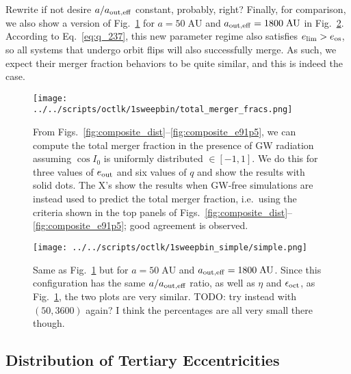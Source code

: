 \documentclass[
        fleqn,
        usenatbib,
    ]{mnras}
\newcommand*{\p}[1]{\left(#1\right)}
\begin{document}
\textcolor{Corr}{Rewrite if not desire $a / a_{\rm out, eff}$ constant,
probably, right?} Finally, for comparison, we also show a version of
Fig.~\ref{fig:total_merger_fracs} for $a = 50\;\mathrm{AU}$ and $a_{\rm out,
eff} = 1800\;\mathrm{AU}$ in Fig.~\ref{fig:sweepbin_simple}. According to
Eq.~\eqref{eq:q_237}, this new parameter regime also satisfies $e_{\lim} >
e_{\rm os}$, so all systems that undergo orbit flips will also successfully
merge. As such, we expect their merger fraction behaviors to be quite similar,
and this is indeed the case.
\begin{figure*}
    \centering
    \texttt{[image: ../../scripts/octlk/1sweepbin/total\_merger\_fracs.png]}
    \caption{From Figs.~\ref{fig:composite_dist}--\ref{fig:composite_e91p5},
    we can compute the total merger fraction in the presence of GW radiation
    assuming $\cos I_0$ is uniformly distributed $\in [-1, 1]$. We do this for
    three values of $e_{\rm out}$ and six values of $q$ and show the results
    with solid dots. The X's show the results when GW-free simulations are
    instead used to predict the total merger fraction, i.e.\ using the
    criteria shown in the top panels of
    Figs.~\ref{fig:composite_dist}--\ref{fig:composite_e91p5}; good agreement
    is observed. }\label{fig:total_merger_fracs}
\end{figure*}
\begin{figure*}
    \centering
    \texttt{[image: ../../scripts/octlk/1sweepbin\_simple/simple.png]}
    \caption{Same as Fig.~\ref{fig:total_merger_fracs} but for $a =
    50\;\mathrm{AU}$ and $a_{\rm out, eff} = 1800\;\mathrm{AU}$. Since this
    configuration has the same $a / a_{\rm out, eff}$ ratio, as well as $\eta$
    and $\epsilon_{\rm oct}$, as Fig.~\ref{fig:total_merger_fracs}, the two
    plots are very similar. \textcolor{Corr}{TODO\@: try instead with $\p{50,
    3600}$ again? I think the percentages are all very small there
    though.}}\label{fig:sweepbin_simple}
\end{figure*}

\subsection{Distribution of Tertiary Eccentricities}
\end{document}
